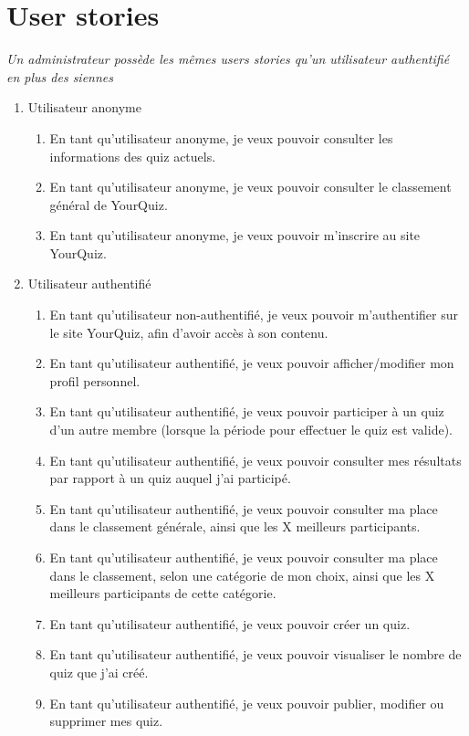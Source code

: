 \documentclass[a4paper, 12pt]{article}
\begin{document}
\section{User stories}
\textit{Un administrateur possède les mêmes users stories qu'un utilisateur authentifié en plus des siennes}
\begin{enumerate}
    \item Utilisateur anonyme
    \begin{enumerate}
        \item En tant qu'utilisateur anonyme, je veux pouvoir consulter les informations des quiz actuels.
        \item En tant qu'utilisateur anonyme, je veux pouvoir consulter le classement général de YourQuiz.
        \item En tant qu'utilisateur anonyme, je veux pouvoir m'inscrire au site YourQuiz.
    \end{enumerate}
    \item Utilisateur authentifié
    \begin{enumerate}
        \item En tant qu'utilisateur non-authentifié, je veux pouvoir m'authentifier sur le site YourQuiz, afin d'avoir accès à son contenu.
        \item En tant qu'utilisateur authentifié, je veux pouvoir afficher/modifier mon profil personnel.
        \item En tant qu'utilisateur authentifié, je veux pouvoir participer à un quiz d'un autre membre (lorsque la période pour effectuer le quiz est valide).
        \item En tant qu'utilisateur authentifié, je veux pouvoir consulter mes résultats par rapport à un quiz auquel j'ai participé.
        \item En tant qu'utilisateur authentifié, je veux pouvoir consulter ma place dans le classement générale, ainsi que les X meilleurs participants.
        \item En tant qu'utilisateur authentifié, je veux pouvoir consulter ma place dans le classement, selon une catégorie de mon choix, ainsi que les X meilleurs participants de cette catégorie.
        \item En tant qu'utilisateur authentifié, je veux pouvoir créer un quiz.
        \item En tant qu'utilisateur authentifié, je veux pouvoir visualiser le nombre de quiz que j'ai créé.
        \item En tant qu'utilisateur authentifié, je veux pouvoir publier, modifier ou supprimer mes quiz.

\end{enumerate}
\end{enumerate}
\end{document}

